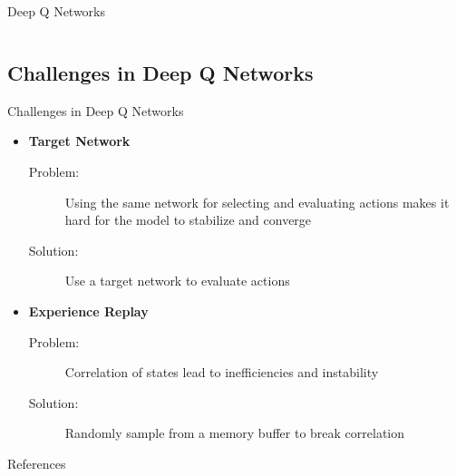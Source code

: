 \documentclass[xcolor=dvipsnames]{beamer}
\begin{document}
\begin{frame}{Deep Q Networks}
\begin{columns}
\begin{column}{0.48\textwidth}
\begin{block}
\begin{minipage}[c][2.5cm][c]{\linewidth}
                \end{minipage}
            \end{block}
        \end{column}
    \end{columns}
    \vspace{5mm}
\end{frame}

\subsection{Challenges in Deep Q Networks}
\begin{frame}{Challenges in Deep Q Networks}
    \begin{itemize}
        \item \textbf{Target Network}
        \begin{description}
            \item[Problem:] Using the same network for selecting and evaluating actions makes it hard for the model to stabilize and converge
            \item[Solution:] Use a target network to evaluate actions
        \end{description}
        \item \textbf{Experience Replay}
        \begin{description}
            \item[Problem:] Correlation of states lead to inefficiencies and instability
            \item[Solution:] Randomly sample from a memory buffer to break correlation
        \end{description}
    \end{itemize}
\end{frame}


\begin{frame}[allowframebreaks]{References}


\end{frame}
\end{document}
